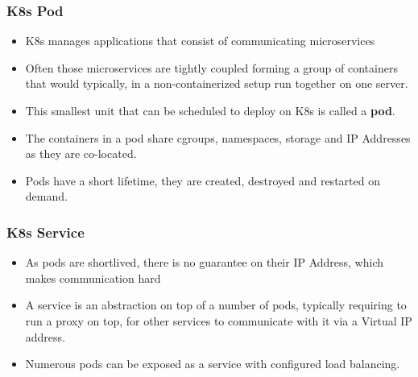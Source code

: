 \documentclass{article}
\begin{document}
\subsubsection{K8s Pod}
\begin{itemize}
    \item K8s manages applications that consist of communicating microservices
    
    \item  Often those microservices are tightly coupled forming a group of containers that would typically, in a non-containerized setup run together on one server.
    
    \item This smallest unit that can be scheduled to deploy on K8s is called a \textbf{pod}. 
    
    \item The containers in a pod share cgroups, namespaces, storage and IP Addresses as they are co-located. 
    
    \item Pods have a short lifetime, they are created, destroyed and restarted on demand. 
\end{itemize}

\subsubsection{K8s Service}
\begin{itemize}
    \item As pods are shortlived, there is no guarantee on their IP Address, which makes communication hard
    
    \item  A service is an abstraction on top of a number of pods, typically requiring to run a proxy on top, for other services to communicate with it via a Virtual IP address.
    
    \item Numerous pods can be exposed as a service with configured load balancing. 
\end{itemize}
\end{document}
